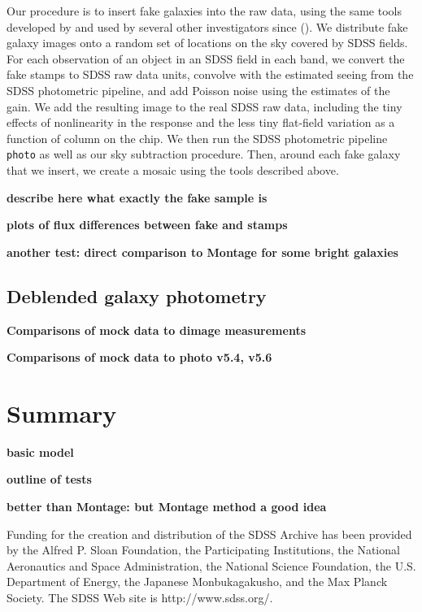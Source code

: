 \documentclass[10pt,preprint]{aastex}
\begin{document}
Our procedure is to insert fake galaxies into the raw data, using the
same tools developed by \citet{blanton05b} and used by several other
investigators since (\citealt{blanton04b, mandelbaum06a, masjedi06a}).
We distribute fake galaxy images onto a random set of locations on the
sky covered by SDSS fields. For each observation of an object in an
SDSS field in each band, we convert the fake stamps to SDSS raw data
units, convolve with the estimated seeing from the SDSS photometric
pipeline, and add Poisson noise using the estimates of the gain. We
add the resulting image to the real SDSS raw data, including the tiny
effects of nonlinearity in the response and the less tiny flat-field
variation as a function of column on the chip. We then run the SDSS
photometric pipeline {\tt photo} as well as our sky subtraction
procedure. Then, around each fake galaxy that we insert, we create a
mosaic using the tools described above.

{\bf describe here what exactly the fake sample is}

{\bf plots of flux differences between fake and stamps}

{\bf another test: direct comparison to Montage for some bright
galaxies}

\subsection{Deblended galaxy photometry}
\label{sec:deblendgal}

{\bf Comparisons of mock data to dimage measurements}

{\bf Comparisons of mock data to photo v5.4, v5.6}

\section{ Summary}

{\bf basic model}

{\bf outline of tests}

{\bf better than Montage: but Montage method a good idea}

\acknowledgments

Funding for the creation and distribution of the SDSS Archive has been
provided by the Alfred P. Sloan Foundation, the Participating
Institutions, the National Aeronautics and Space Administration, the
National Science Foundation, the U.S. Department of Energy, the
Japanese Monbukagakusho, and the Max Planck Society. The SDSS Web site
is http://www.sdss.org/.
\end{document}
